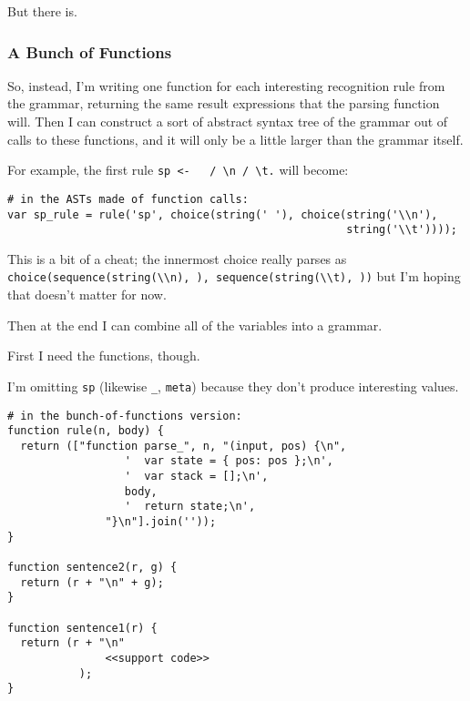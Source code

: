 \documentclass[
]{article}
\begin{document}
But there is.

\hypertarget{a-bunch-of-functions}{%
\subsubsection{A Bunch of Functions}\label{a-bunch-of-functions}}

So, instead, I'm writing one function for each interesting recognition
rule from the grammar, returning the same result expressions that the
parsing function will. Then I can construct a sort of abstract syntax
tree of the grammar out of calls to these functions, and it will only be
a little larger than the grammar itself.

For example, the first rule
\texttt{sp\ \textless{}-\ \textquotesingle{}\ \textquotesingle{}\ /\ \textquotesingle{}\textbackslash{}n\textquotesingle{}\ /\ \textquotesingle{}\textbackslash{}t\textquotesingle{}.}
will become:

\begin{verbatim}
# in the ASTs made of function calls:
var sp_rule = rule('sp', choice(string(' '), choice(string('\\n'), 
                                                    string('\\t'))));
\end{verbatim}

This is a bit of a cheat; the innermost choice really parses as
\texttt{choice(sequence(string(\textquotesingle{}\textbackslash{}\textbackslash{}n\textquotesingle{}),\ \textquotesingle{}\textquotesingle{}),\ sequence(string(\textquotesingle{}\textbackslash{}\textbackslash{}t\textquotesingle{}),\ \textquotesingle{}\textquotesingle{}))}
but I'm hoping that doesn't matter for now.

Then at the end I can combine all of the variables into a grammar.

First I need the functions, though.

I'm omitting \texttt{sp} (likewise \texttt{\_}, \texttt{meta}) because
they don't produce interesting values.

\begin{verbatim}
# in the bunch-of-functions version:
function rule(n, body) {
  return (["function parse_", n, "(input, pos) {\n",
                  '  var state = { pos: pos };\n',
                  '  var stack = [];\n',
                  body, 
                  '  return state;\n',
               "}\n"].join(''));
}

function sentence2(r, g) {
  return (r + "\n" + g);
}

function sentence1(r) {
  return (r + "\n"
               <<support code>>
           );
}
\end{verbatim}
\end{document}
